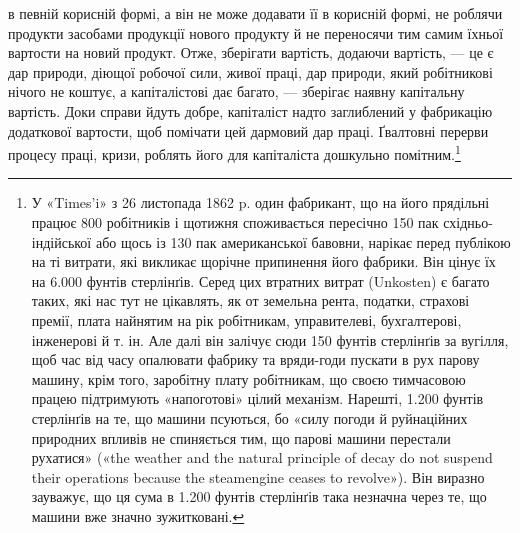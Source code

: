 \parcont{}  %
в певній корисній формі, а він не може додавати її в корисній
формі, не роблячи продукти засобами продукції нового продукту
й не переносячи тим самим їхньої вартости на новий продукт.
Отже, зберігати вартість, додаючи вартість, — це є дар природи,
діющої робочої сили, живої праці, дар природи, який робітникові
нічого не коштує, а капіталістові дає багато, — зберігає наявну
капітальну вартість.  Доки справи йдуть добре, капіталіст
надто заглиблений у фабрикацію додаткової вартости, щоб помічати
цей дармовий дар праці. Ґвалтовні перерви процесу праці,
кризи, роблять його для капіталіста дошкульно помітним.\footnote{
У «Times’i» з 26 листопада 1862 p. один фабрикант, що на його
прядільні працює 800 робітників і щотижня споживається пересічно 150 пак
східньо-індійської або щось із 130 пак американської бавовни, нарікає
перед публікою на ті витрати, які викликає щорічне припинення його
фабрики. Він цінує їх на 6.000 фунтів стерлінґів. Серед цих втратних
витрат (Unkosten) є багато таких, які нас тут не цікавлять, як от земельна
рента, податки, страхові премії, плата найнятим на рік робітникам, управителеві,
бухгалтерові, інженерові й т. ін. Але далі він залічує сюди
150 фунтів стерлінґів за вугілля, щоб час від часу опалювати фабрику та
вряди-годи пускати в рух парову машину, крім того, заробітну плату
робітникам, що своєю тимчасовою працею підтримують «напоготові»
цілий механізм. Нарешті, 1.200 фунтів стерлінґів на те, що машини псуються,
бо «силу погоди й руйнаційних природних впливів не спиняється
тим, що парові машини перестали рухатися» («the weather and the natural
principle of decay do not suspend their operations because the steamengine
ceases to revolve»). Він виразно зауважує, що ця сума в 1.200 фунтів
стерлінґів така незначна через те, що машини вже значно зужитковані.
}

